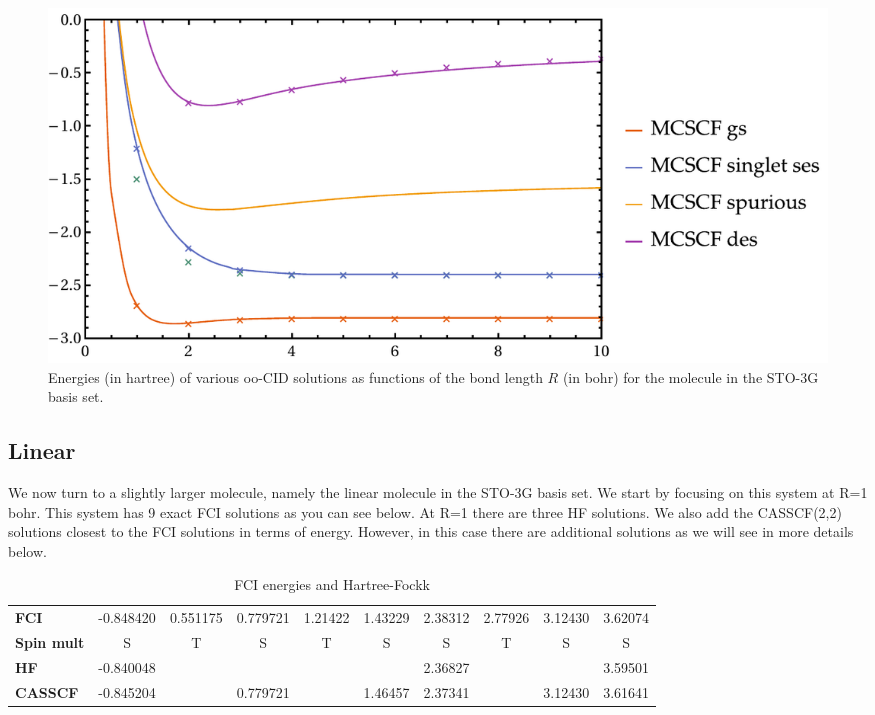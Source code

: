 \documentclass[11pt,a4paper]{article}
\begin{document}
\begin{figure}
  \centering
  \includegraphics[width=0.75\linewidth]{Figures/HHe_ooCID_PES}
  \caption{
    Energies (in hartree) of various oo-CID solutions as functions of the bond length $R$ (in bohr) for the  molecule in the STO-3G basis set.
    \label{fig:HHeooCID}}
\end{figure}

\subsection{Linear }

We now turn to a slightly larger molecule, namely the linear  molecule in the STO-3G basis set.
We start by focusing on this system at R=1 bohr. This system has 9 exact FCI solutions as you can see below. At R=1 there are three HF solutions.
We also add the CASSCF(2,2) solutions closest to the FCI solutions in terms of energy. However, in this case there are additional solutions as we will see in more details below.

\begin{table}[h!]
  \begin{center}
    \caption{FCI energies and Hartree-Fockk}
    \label{tab:table1}
    \begin{tabular}{l|c|c|c|c|c|c|c|c|c}
      \textbf{FCI} & -0.848420 & 0.551175 & 0.779721 & 1.21422 & 1.43229 & 2.38312 & 2.77926 & 3.12430 & 3.62074 \\
      \textbf{Spin mult} & S & T & S & T & S & S & T & S & S \\
      \hline
      \textbf{HF} & -0.840048 &  &  &  &  & 2.36827 &  &  & 3.59501 \\
      \hline
      \textbf{CASSCF} & -0.845204 &  & 0.779721 &  & 1.46457 & 2.37341 &  & 3.12430 & 3.61641 \\
    \end{tabular}
  \end{center}
\end{table}
\end{document}
